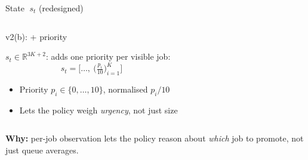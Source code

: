 \begin{frame}{State $\;s_t$ \hfill \small\textcolor{SoftCoral}{(redesigned)}}
\begin{columns}[T,onlytextwidth]
    \hfill
      \begin{block}{v2(b): + priority}
        \begin{minipage}[t][4.0cm]{\linewidth}
        \begin{minipage}[t][2.0cm]{\linewidth}
        $s_t \in \mathbb{R}^{3K+2}$: adds one priority per visible job:
        $$
          s_t = \Big[\dots,\ \big(\tfrac{p_i}{10}\big)_{i=1}^{K}\Big]
        $$
        \end{minipage}
        \begin{itemize}\setlength\itemsep{3pt}
          \item Priority $p_i \in \{0,\dots,10\}$, normalised $p_i/10$
          \item Lets the policy weigh \emph{urgency}, not just size
        \end{itemize}
        \end{minipage}
      \end{block}
  \end{columns}

  \vspace{0.2em}
  \centering
  \small\textcolor{DeepBlue}{\textbf{Why:}} per-job observation lets the policy reason about \emph{which} job to promote, not just queue averages.
  \vspace{1em}
  
\end{frame}

